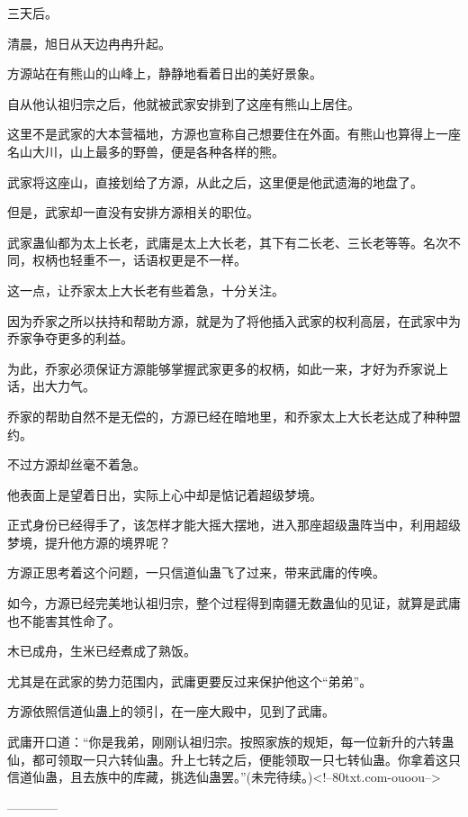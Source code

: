 \begin{this_body}
三天后。

清晨，旭日从天边冉冉升起。

方源站在有熊山的山峰上，静静地看着日出的美好景象。

自从他认祖归宗之后，他就被武家安排到了这座有熊山上居住。

这里不是武家的大本营福地，方源也宣称自己想要住在外面。有熊山也算得上一座名山大川，山上最多的野兽，便是各种各样的熊。

武家将这座山，直接划给了方源，从此之后，这里便是他武遗海的地盘了。

但是，武家却一直没有安排方源相关的职位。

武家蛊仙都为太上长老，武庸是太上大长老，其下有二长老、三长老等等。名次不同，权柄也轻重不一，话语权更是不一样。

这一点，让乔家太上大长老有些着急，十分关注。

因为乔家之所以扶持和帮助方源，就是为了将他插入武家的权利高层，在武家中为乔家争夺更多的利益。

为此，乔家必须保证方源能够掌握武家更多的权柄，如此一来，才好为乔家说上话，出大力气。

乔家的帮助自然不是无偿的，方源已经在暗地里，和乔家太上大长老达成了种种盟约。

不过方源却丝毫不着急。

他表面上是望着日出，实际上心中却是惦记着超级梦境。

正式身份已经得手了，该怎样才能大摇大摆地，进入那座超级蛊阵当中，利用超级梦境，提升他方源的境界呢？

方源正思考着这个问题，一只信道仙蛊飞了过来，带来武庸的传唤。

如今，方源已经完美地认祖归宗，整个过程得到南疆无数蛊仙的见证，就算是武庸也不能害其性命了。

木已成舟，生米已经煮成了熟饭。

尤其是在武家的势力范围内，武庸更要反过来保护他这个“弟弟”。

方源依照信道仙蛊上的领引，在一座大殿中，见到了武庸。

武庸开口道：“你是我弟，刚刚认祖归宗。按照家族的规矩，每一位新升的六转蛊仙，都可领取一只六转仙蛊。升上七转之后，便能领取一只七转仙蛊。你拿着这只信道仙蛊，且去族中的库藏，挑选仙蛊罢。”(未完待续。)<!--80txt.com-ouoou-->

------------

\end{this_body}

